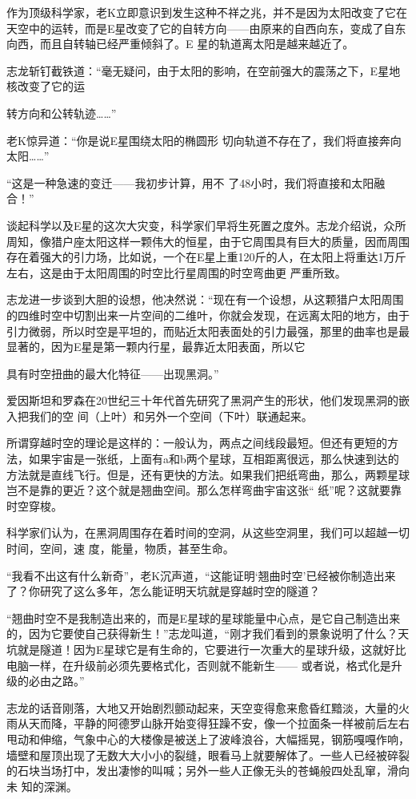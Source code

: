 \documentclass{article}
\begin{document}
作为顶级科学家，老K立即意识到发生这种不祥之兆，并不是因为太阳改变了它在天空中的运转，而是E星改变了它的自转方向——由原来的自西向东，变成了自东向西，而且自转轴已经严重倾斜了。E
星的轨道离太阳是越来越近了。 

志龙斩钉截铁道：“毫无疑问，由于太阳的影响，在空前强大的震荡之下，E星地核改变了它的运

\newpage
转方向和公转轨迹……” 

老K惊异道：“你是说E星围绕太阳的椭圆形
切向轨道不存在了，我们将直接奔向太阳……” 

“这是一种急速的变迁——我初步计算，用不
了48小时，我们将直接和太阳融合！” 

谈起科学以及E星的这次大灾变，科学家们早将生死置之度外。志龙介绍说，众所周知，像猎户座太阳这样一颗伟大的恒星，由于它周围具有巨大的质量，因而周围存在着强大的引力场，比如说，一个在E星上重120斤的人，在太阳上将重达1万斤左右，这是由于太阳周围的时空比行星周围的时空弯曲更
严重所致。 

志龙进一步谈到大胆的设想，他决然说：“现在有一个设想，从这颗猎户太阳周围的四维时空中切割出来一片空间的二维叶，你就会发现，在远离太阳的地方，由于引力微弱，所以时空是平坦的，而贴近太阳表面处的引力最强，那里的曲率也是最显著的，因为E星是第一颗内行星，最靠近太阳表面，所以它
\newpage

具有时空扭曲的最大化特征——出现黑洞。” 

爱因斯坦和罗森在20世纪三十年代首先研究了黑洞产生的形状，他们发现黑洞的嵌入把我们的空
间（上叶）和另外一个空间（下叶）联通起来。 

所谓穿越时空的理论是这样的：一般认为，两点之间线段最短。但还有更短的方法，如果宇宙是一张纸，上面有a和b两个星球，互相距离很远，那么快速到达的方法就是直线飞行。但是，还有更快的方法。如果我们把纸弯曲，那么，两颗星球岂不是靠的更近？这个就是翘曲空间。那么怎样弯曲宇宙这张“
纸”呢？这就要靠时空穿梭。 

科学家们认为，在黑洞周围存在着时间的空洞，从这些空洞里，我们可以超越一切时间，空间，速
度，能量，物质，甚至生命。 

“我看不出这有什么新奇”，老K沉声道，“这能证明‘翘曲时空’已经被你制造出来了？你研究了这么多年，怎么能证明天坑就是穿越时空的隧道？
\newpage


“翘曲时空不是我制造出来的，而是E星球的星球能量中心点，是它自己制造出来的，因为它要使自己获得新生！”志龙叫道，“刚才我们看到的景象说明了什么？天坑就是隧道！因为E星球它是有生命的，它要进行一次重大的星球升级，这就好比电脑一样，在升级前必须先要格式化，否则就不能新生——
或者说，格式化是升级的必由之路。” 

志龙的话音刚落，大地又开始剧烈颤动起来，天空变得愈来愈昏红黯淡，大量的火雨从天而降，平静的阿德罗山脉开始变得狂躁不安，像一个拉面条一样被前后左右甩动和伸缩，气象中心的大楼像是被送上了波峰浪谷，大幅摇晃，钢筋嘎嘎作响，墙壁和屋顶出现了无数大大小小的裂缝，眼看马上就要解体了。一些人已经被碎裂的石块当场打中，发出凄惨的叫喊；另外一些人正像无头的苍蝇般四处乱窜，滑向未
知的深渊。 
\end{document}
